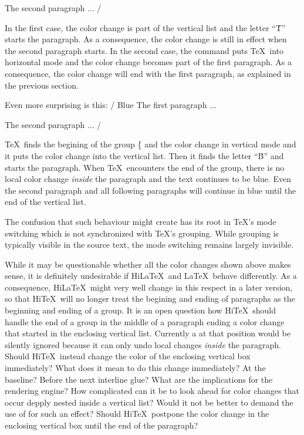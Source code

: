 The second paragraph ...
/
\medskip

In the first case, the color change is part of the vertical list
and the letter ``\.T'' starts the paragraph. 
As a consequence, the color change is still in effect when the second
paragraph starts.
In the second case, the  command puts \TeX\ into horizontal mode
and the color change becomes part of the first paragraph.
As a consequence, the color change will end with the first paragraph, as explained
in the previous section.

Even more surprising is this:
\medskip
\verbatim/{\color{blue} Blue} The first paragraph ...

The second paragraph ...
/
\medskip


\TeX\ finds the begining of the group \.{\{} and the color change in vertical mode
and it puts the color change into the vertical list. Then it finds the letter
``\.B'' and starts the paragraph. When \TeX\ encounters the end of the group,
there is no local color change {\it inside} the paragraph and the text
continues to be blue. Even the second paragraph and all following paragraphs
will continue in blue until the end of the vertical list.

The confusion that such behaviour might create has its root in \TeX's
mode switching which is not synchronized with \TeX's grouping.
While grouping is typically visible in the source text, the mode
switching remains largely invisible. 


\bigskip{}\par\smallskip\noindent
While it may be questionable whether all the color changes shown above
makes sense, it is definitely undesirable if Hi\LaTeX\ and \LaTeX\
behave differently.
As a consequence,  Hi\LaTeX\ might very well change in this respect in a
later version, so that  Hi\TeX\ will no longer treat the begining
and ending of paragraphs as the beginning and ending of a group.
It is an open question how Hi\TeX\ should handle the end of a group
in the middle of a paragraph ending a color change that started in
the enclosing vertical list. Currently a \ctl{HINTendcolor} at that
position would be silently ignored because it can only undo local
changes {\it inside} the paragraph. Should Hi\TeX\ instead change the color
of the enclosing vertical box immediately? What does
it mean to do this change immediately? At the baseline?
Before the next interline glue? What are the implications for the
rendering engine? How complicated can it be to look ahead
for color changes that occur depply nested inside a vertical list?
Would it not be better to demand the use of \ctl{vadjust} for such an effect?
Should Hi\TeX\ postpone the color change in the enclosing vertical
box until the end of the paragraph?

